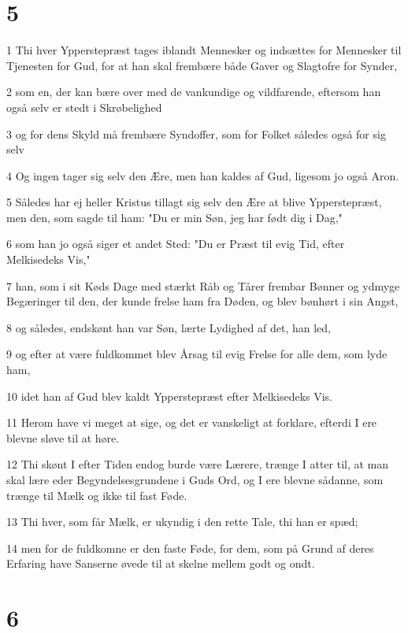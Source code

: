 \chapter{5}

\par 1 Thi hver Ypperstepræst tages iblandt Mennesker og indsættes for Mennesker til Tjenesten for Gud, for at han skal frembære både Gaver og Slagtofre for Synder,
\par 2 som en, der kan bære over med de vankundige og vildfarende, eftersom han også selv er stedt i Skrøbelighed
\par 3 og for dens Skyld må frembære Syndoffer, som for Folket således også for sig selv
\par 4 Og ingen tager sig selv den Ære, men han kaldes af Gud, ligesom jo også Aron.
\par 5 Således har ej heller Kristus tillagt sig selv den Ære at blive Ypperstepræst, men den, som sagde til ham: "Du er min Søn, jeg har født dig i Dag,"
\par 6 som han jo også siger et andet Sted: "Du er Præst til evig Tid, efter Melkisedeks Vis,"
\par 7 han, som i sit Køds Dage med stærkt Råb og Tårer frembar Bønner og ydmyge Begæringer til den, der kunde frelse ham fra Døden, og blev bønhørt i sin Angst,
\par 8 og således, endskønt han var Søn, lærte Lydighed af det, han led,
\par 9 og efter at være fuldkommet blev Årsag til evig Frelse for alle dem, som lyde ham,
\par 10 idet han af Gud blev kaldt Ypperstepræst efter Melkisedeks Vis.
\par 11 Herom have vi meget at sige, og det er vanskeligt at forklare, efterdi I ere blevne sløve til at høre.
\par 12 Thi skønt I efter Tiden endog burde være Lærere, trænge I atter til, at man skal lære eder Begyndelsesgrundene i Guds Ord, og I ere blevne sådanne, som trænge til Mælk og ikke til fast Føde.
\par 13 Thi hver, som får Mælk, er ukyndig i den rette Tale, thi han er spæd;
\par 14 men for de fuldkomne er den faste Føde, for dem, som på Grund af deres Erfaring have Sanserne øvede til at skelne mellem godt og ondt.

\chapter{6}

